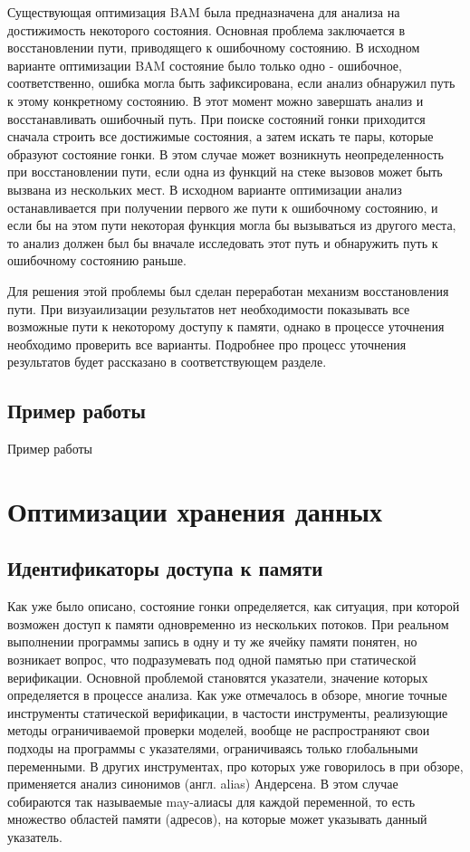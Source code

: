 Существующая оптимизация BAM была предназначена для анализа на достижимость некоторого состояния.
Основная проблема заключается в восстановлении пути, приводящего к ошибочному состоянию.
В исходном варианте оптимизации BAM состояние было только одно - ошибочное, соответственно, ошибка могла быть зафиксирована, если анализ обнаружил путь к этому конкретному состоянию.
В этот момент можно завершать анализ и восстанавливать ошибочный путь.
При поиске состояний гонки приходится сначала строить все достижимые состояния, а затем искать те пары, которые образуют состояние гонки.
В этом случае может возникнуть неопределенность при восстановлении пути, если одна из функций на стеке вызовов может быть вызвана из нескольких мест.
В исходном варианте оптимизации анализ останавливается при получении первого же пути к ошибочному состоянию, и если бы на этом пути некоторая функция могла бы вызываться из другого места, то анализ должен был бы вначале исследовать этот путь и обнаружить путь к ошибочному состоянию раньше.

Для решения этой проблемы был сделан переработан механизм восстановления пути. 
При визуаилизации результатов нет необходимости показывать все возможные пути к некоторому доступу к памяти, однако в процессе уточнения необходимо проверить все варианты.
Подробнее про процесс уточнения результатов будет рассказано в соответствующем разделе.


\subsection{Пример работы} \label{sect_impl_example}
Пример работы 

\section{Оптимизации хранения данных} \label{sect_impl_storage}

\subsection{Идентификаторы доступа к памяти} \label{subsect_impl_identifiers}

Как уже было описано, состояние гонки определяется, как ситуация, при которой возможен доступ к памяти одновременно из нескольких потоков. 
При реальном выполнении программы запись в одну и ту же ячейку памяти понятен, но возникает вопрос, что подразумевать под одной памятью при статической верификации.
Основной проблемой становятся указатели, значение которых определяется в процессе анализа.
Как уже отмечалось в обзоре, многие точные инструменты статической верификации, в частости инструменты, реализующие методы ограничиваемой проверки моделей, вообще не распространяют свои подходы на программы с указателями, ограничиваясь только глобальными переменными.
В других инструментах, про которых уже говорилось в при обзоре, применяется анализ синонимов (англ. alias) Андерсена.
В этом случае собираются так называемые may-алиасы для каждой переменной, то есть множество областей памяти (адресов), на которые может указывать данный указатель.

